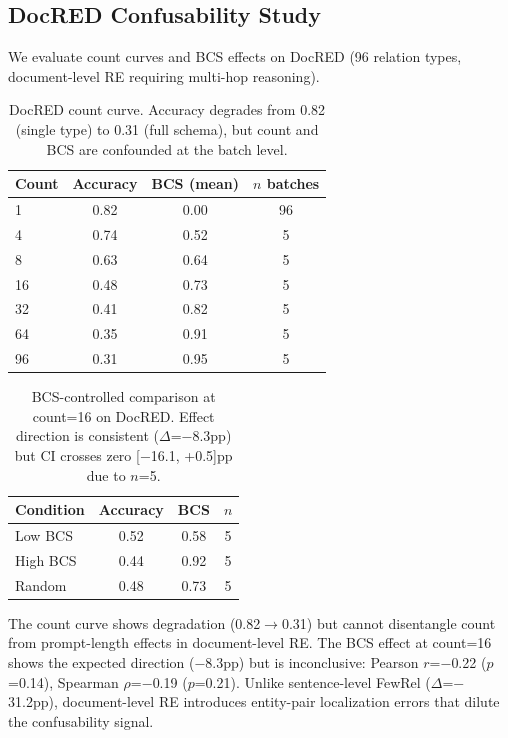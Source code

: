 \documentclass[11pt,a4paper]{article}
\begin{document}
\subsection{DocRED Confusability Study}
\label{sec:docred}

We evaluate count curves and BCS effects on DocRED (96 relation types, document-level RE requiring multi-hop reasoning).

\begin{table}[h]
\centering
\small
\begin{tabular}{@{}lccc@{}}
\toprule
\textbf{Count} & \textbf{Accuracy} & \textbf{BCS (mean)} & \textbf{$n$ batches} \\
\midrule
1 & 0.82 & 0.00 & 96 \\
4 & 0.74 & 0.52 & 5 \\
8 & 0.63 & 0.64 & 5 \\
16 & 0.48 & 0.73 & 5 \\
32 & 0.41 & 0.82 & 5 \\
64 & 0.35 & 0.91 & 5 \\
96 & 0.31 & 0.95 & 5 \\
\bottomrule
\end{tabular}
\caption{DocRED count curve. Accuracy degrades from 0.82 (single type) to 0.31 (full schema), but count and BCS are confounded at the batch level.}
\label{tab:docred_count}
\end{table}

\begin{table}[h]
\centering
\small
\begin{tabular}{@{}lccc@{}}
\toprule
\textbf{Condition} & \textbf{Accuracy} & \textbf{BCS} & \textbf{$n$} \\
\midrule
Low BCS & 0.52 & 0.58 & 5 \\
High BCS & 0.44 & 0.92 & 5 \\
Random & 0.48 & 0.73 & 5 \\
\bottomrule
\end{tabular}
\caption{BCS-controlled comparison at count=16 on DocRED. Effect direction is consistent ($\Delta$=$-$8.3pp) but CI crosses zero [$-$16.1, +0.5]pp due to $n$=5.}
\label{tab:docred_bcs}
\end{table}

The count curve shows degradation (0.82$\rightarrow$0.31) but cannot disentangle count from prompt-length effects in document-level RE. The BCS effect at count=16 shows the expected direction ($-$8.3pp) but is inconclusive: Pearson $r$=$-$0.22 ($p$=0.14), Spearman $\rho$=$-$0.19 ($p$=0.21). Unlike sentence-level FewRel ($\Delta$=$-$31.2pp), document-level RE introduces entity-pair localization errors that dilute the confusability signal.
\end{document}
